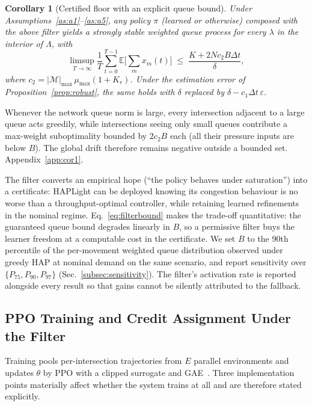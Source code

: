 \documentclass[journal]{IEEEtran}
\newtheorem{corollary}{Corollary}
\newcommand{\Mset}{\mathcal{M}}
\begin{document}
\begin{corollary}[Certified floor with an explicit queue bound]
\label{cor:filter}
Under Assumptions~\ref{as:a1}--\ref{as:a5}, any policy $\pi$ (learned or
otherwise) composed with the above filter yields a strongly stable
weighted queue process for every $\lambda$ in the interior of $\Lambda$,
with
\begin{equation}
\limsup_{T\to\infty}\frac1T\sum_{t=0}^{T-1}
 \mathbb{E}\Big[\sum_m x_m(t)\Big]
 \;\le\; \frac{K + 2 N c_2 B \Delta t}{\delta},
\label{eq:filterbound}
\end{equation}
where $c_2 = |\Mset|_{\max}\,\mu_{\max}(1+K_r)$. Under the estimation
error of Proposition~\ref{prop:robust}, the same holds with $\delta$
replaced by $\delta - c_1 \Delta t\,\varepsilon$.
\end{corollary}

\begin{IEEEproof}
Whenever the network queue norm is large, every intersection adjacent to
a large queue acts greedily, while intersections seeing only small
queues contribute a max-weight suboptimality bounded by $2c_2 B$ each
(all their pressure inputs are below $B$). The global drift therefore
remains negative outside a bounded set. Appendix~\ref{app:cor1}.
\end{IEEEproof}

The filter converts an empirical hope (``the policy behaves under
saturation'') into a certificate: HAPLight can be deployed knowing its
congestion behaviour is no worse than a throughput-optimal controller,
while retaining learned refinements in the nominal regime.
Eq.~\eqref{eq:filterbound} makes the trade-off quantitative: the
guaranteed queue bound degrades linearly in $B$, so a permissive filter
buys the learner freedom at a computable cost in the certificate. We set
$B$ to the 90th percentile of the per-movement weighted queue
distribution observed under greedy HAP at nominal demand on the same
scenario, and report sensitivity over $\{P_{75},P_{90},P_{97}\}$
(Sec.~\ref{subsec:sensitivity}). The filter's activation rate is reported
alongside every result so that gains cannot be silently attributed to the
fallback.

\subsection{PPO Training and Credit Assignment Under the Filter}
\label{subsec:training}
Training pools per-intersection trajectories from $E$ parallel
environments and updates $\theta$ by PPO with a clipped surrogate and
GAE~\cite{b_ppo,b_mappo}. Three implementation points materially affect
whether the system trains at all and are therefore stated explicitly.
\end{document}
